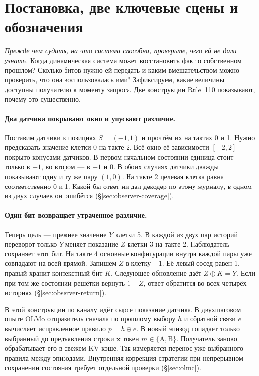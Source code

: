 \section{Постановка, две ключевые сцены и обозначения}
\emph{Прежде чем судить, на что система способна, проверьте, чего ей не дали узнать.}
Когда динамическая система может восстановить факт о собственном прошлом?
Сколько битов нужно ей передать и каким вмешательством можно проверить, что она
воспользовалась ими? Зафиксируем, какие величины доступны получателю к моменту
запроса. Две конструкции Rule~110 показывают, почему это существенно.

\paragraph{Два датчика покрывают окно и упускают различие.}
Поставим датчики в позициях $S=(-1,1)$ и прочтём их на тактах 0 и 1.
Нужно предсказать значение клетки 0 на такте 2. Всё окно её зависимости
$[-2,2]$ покрыто конусами датчиков. В первом начальном состоянии единица стоит только в $-1$,
во втором --- в $-1$ и $0$.
В обоих случаях датчики дважды показывают одну и ту же пару $(1,0)$.
На такте 2 целевая клетка равна соответственно 0 и 1. Какой бы ответ ни дал
декодер по этому журналу, в одном из двух случаев он ошибётся
(§\ref{sec:observer-coverage}).

\paragraph{Один бит возвращает утраченное различие.}
Теперь цель --- прежнее значение $Y$ клетки 5. В каждой из двух пар историй
переворот только $Y$ меняет показание $Z$ клетки 3 на такте 2. Наблюдатель
сохраняет этот бит. На такте 4 основные конфигурации внутри каждой пары
уже совпадают на всей прямой. Запишем $Z$ в клетку $-1$. Её левый сосед
равен 1, правый хранит контекстный бит $K$. Следующее обновление даёт
$Z\oplus K=Y$. Если при том же состоянии решётки вернуть $1-Z$, ответ
обратится во всех четырёх историях (§\ref{sec:observer-return}).

В этой конструкции по каналу идёт сырое показание датчика. В двухшаговом
опыте OLMo отправитель сначала по прошлому выбору $h$ и обратной связи $e$
вычисляет исправленное правило $p=h\oplus e$. В новый эпизод попадает только
выбранный до предъявления строки $\mathbf{x}$ токен $m\in\{\mathrm{A},\mathrm{B}\}$.
Получатель заново обрабатывает его в свежем KV-кэше. Так измеряется перенос
уже выбранного правила между эпизодами. Внутренняя коррекция стратегии при
непрерывном сохранении состояния требует отдельной проверки (§\ref{sec:olmo}).

